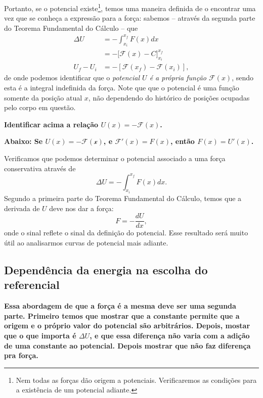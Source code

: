 Portanto, se o potencial existe\footnote{Nem todas as forças dão origem a potenciais. Verificaremos as condições para a existência de um potencial adiante.}, temos uma maneira definida de o encontrar uma vez que se conheça a expressão para a força: sabemos -- através da segunda parte do Teorema Fundamental do Cálculo -- que 
\begin{align}
    \Delta U &= - \int_{x_i}^{x_f} F(x) dx \\
    &= -\big[\mathcal{F}(x) - C\big]_{x_i}^{x_f} \\
    U_f - U_i &= -[\mathcal{F}(x_f) - \mathcal{F}(x_i)],
\end{align}
%
de onde podemos identificar que o \emph{potencial $U$ é a própria função $\mathcal{F}(x)$}, sendo esta é a integral indefinida da força. Note que que o potencial é uma função somente da posição atual $x$, não dependendo do histórico de posições ocupadas pelo corpo em questão.

\textbf{Identificar acima a relação $U(x) = -\mathcal{F}(x)$.}

\textbf{Abaixo: Se $U(x) = -\mathcal{F(x)}$, e $\mathcal{F}'(x) = F(x)$, então $F(x) = U'(x)$.}

Verificamos que podemos determinar o potencial associado a uma força conservativa através de
\begin{equation}
  \Delta U = - \int_{x_i}^{x_f} F(x) dx.
\end{equation}
%
Segundo a primeira parte do Teorema Fundamental do Cálculo, temos que a derivada de $U$ deve nos dar a força:
\begin{equation}\label{Eq:ForcaGradPot}
  F =  -\frac{dU}{dx},
\end{equation}
%
onde o sinal reflete o sinal da definição do potencial. Esse resultado será muito útil ao analisarmos curvas de potencial mais adiante.

\subsection{Dependência da energia na escolha do referencial}

\textbf{Essa abordagem de que a força é a mesma deve ser uma segunda parte. Primeiro temos que mostrar que a constante permite que a origem e o próprio valor do potencial são arbitrários. Depois, mostar que o que importa é $\Delta U$, e que essa diferença não varia com a adição de uma constante ao potencial. Depois mostrar que não faz diferença pra força.}

